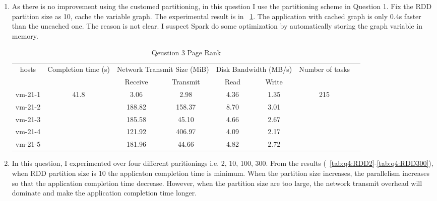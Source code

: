 \begin{enumerate}[label=Question \arabic*.]
    
    \item As there is no improvement using the customed partitioning, in this question I use the partitioning scheme in Question 1. Fix the RDD partition size as 10, cache the variable graph. The experimental result is in \tablename~\ref{tab:q3}. The application with cached graph is only 0.4s faster than the uncached one. The reason is not clear. I suspect Spark do some optimization by automatically storing the graph variable in memory.
    \begin{table}[!h]
        \centering
        \begin{tabular}{|c|c|c|c|c|c|c|c|}
        \hline
            \multirow{2}{*}{hosts} & \multirow{2}{*}{Completion time (s)} & \multicolumn{2}{|c|}{Network Transmit Size (MiB)} & \multicolumn{2}{|c|}{Disk Bandwidth (MB/s)} & \multirow{2}{*}{Number of tasks} \\ 
            \cline{3-6}
    & & Receive & Transmit & Read & Write &  \\
        \hline
            vm-21-1 & \multirow{5}{*}{41.8}  & 3.06   & 2.98   & 4.36 & 1.35 & \multirow{5}{*}{215}  \\
            vm-21-2 &                        & 188.82 & 158.37 & 8.70 & 3.01 &  \\
            vm-21-3 &                        & 185.58 & 45.10  & 4.66 & 2.67 &  \\
            vm-21-4 &                        & 121.92 & 406.97 & 4.09 & 2.17 &  \\
            vm-21-5 &                        & 181.96 & 44.66  & 4.82 & 2.72 &  \\
        \hline
        \end{tabular}
        \caption{Qeustion 3 Page Rank}
        \label{tab:q3}
    \end{table}
    
    \item In this question, I experimented over four different paritionings i.e. 2, 10, 100, 300. From the results (\tablename~\ref{tab:q4:RDD2}-\ref{tab:q4:RDD300}), when RDD partition size is 10 the applicaton completion time is minimum. When the partition size increases, the parallelism increases so that the application completion time decrease. However, when the partition size are too large, the network transmit overhead will dominate and make the application completion time longer.
    

\end{enumerate}
